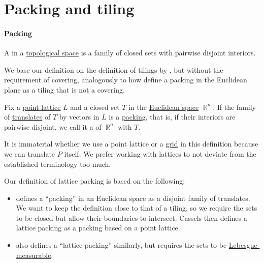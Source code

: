 \section{Packing and tiling}\label{sec:packing_and_tiling}

\paragraph{Packing}

\begin{definition}\label{def:topological_space_packing}\mimprovised
  A  in a \hyperref[def:topological_space]{topological space} is a family of closed sets with pairwise disjoint interiors.
\end{definition}
\begin{comments}
  \item We base our definition on the definition of tilings by , but without the requirement of covering, analogously to how  define a packing in the Euclidean plane as a tiling that is not a covering.
\end{comments}

\begin{definition}\label{def:lattice_packing}\mimprovised
  Fix a \hyperref[def:point_lattice]{point lattice} \( L \) and a closed set \( T \) in the \hyperref[def:euclidean_space]{Euclidean space} \( \BbbR^n \). If the family of \hyperref[def:rigid_motion/translation]{translates} of \( T \) by vectors in \( L \) is a \hyperref[def:topological_space_packing]{packing}, that is, if their interiors are pairwise disjoint, we call it a  of \( \BbbR^n \) with \( T \).
\end{definition}
\begin{comments}
  \item It is immaterial whether we use a point lattice or a \hyperref[def:euclidean_space_grid]{grid} in this definition because we can translate \( P \) itself. We prefer working with lattices to not deviate from the established terminology too much.

  \item Our definition of lattice packing is based on the following:
  \begin{itemize}
    \item {} defines a \enquote{packing} in an Euclidean space as a disjoint family of translates. We want to keep the definition close to that of a tiling, so we require the sets to be closed but allow their boundaries to intersect. Cassels then defines a lattice packing as a packing based on a point lattice.

    \item {} also defines a \enquote{lattice packing} similarly, but requires the sets to be \hyperref[def:lebesgue_measure]{Lebesgue-measurable}.
  \end{itemize}
\end{comments}

